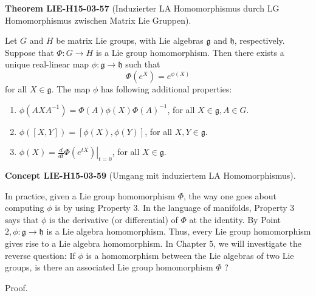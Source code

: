 \documentclass[10pt, letterpaper]{article}
\newcommand{\CustomHeading}[3]{%
  \par\medskip\noindent%
  \textbf{#1 #2} \textnormal{(#3)}.\enskip%
}
\newenvironment{THEO}[2]{\begin{unitbox}\CustomHeading{Theorem}{#1}{#2}}{\end{unitbox}}
\newenvironment{CONC}[2]{\begin{unitbox}\CustomHeading{Concept}{#1}{#2}}{\end{unitbox}}
\begin{document}
\begin{THEO}{LIE-H15-03-57}{Induzierter LA Homomorphismus durch LG Homomorphismus zwischen Matrix Lie Gruppen}
Let $G$ and $H$ be matrix Lie groups, with Lie algebras $\mathfrak{g}$ and $\mathfrak{h}$, respectively. Suppose that $\Phi: G \rightarrow H$ is a Lie group homomorphism. Then there exists a unique real-linear map $\phi: \mathfrak{g} \rightarrow \mathfrak{h}$ such that
$$
\Phi\left(e^{X}\right)=e^{\phi(X)}
$$
for all $X \in \mathfrak{g}$. The map $\phi$ has following additional properties:
\begin{enumerate}
  \item $\phi\left(A X A^{-1}\right)=\Phi(A) \phi(X) \Phi(A)^{-1}$, for all $X \in \mathfrak{g}, A \in G$.
  \item $\phi([X, Y])=[\phi(X), \phi(Y)]$, for all $X, Y \in \mathfrak{g}$.
  \item $\phi(X)=\left.\frac{d}{d t} \Phi\left(e^{t X}\right)\right|_{t=0}$, for all $X \in \mathfrak{g}$.
\end{enumerate}
\end{THEO}


\begin{CONC}{LIE-H15-03-59}{Umgang mit induziertem LA Homomorphismus}
In practice, given a Lie group homomorphism $\Phi$, the way one goes about computing $\phi$ is by using Property 3. In the language of manifolds, Property 3 says that $\phi$ is the derivative (or differential) of $\Phi$ at the identity. By Point $2, \phi: \mathfrak{g} \rightarrow \mathfrak{h}$ is a Lie algebra homomorphism. Thus, every Lie group homomorphism gives rise to a Lie algebra homomorphism. In Chapter 5, we will investigate the reverse question: If $\phi$ is a homomorphism between the Lie algebras of two Lie groups, is there an associated Lie group homomorphism $\Phi$ ?
\end{CONC}

Proof. 
\end{document}
